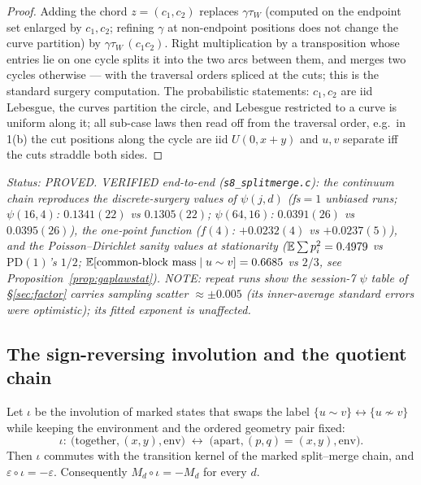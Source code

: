 \begin{proof}
Adding the chord $z=(c_1,c_2)$ replaces $\gamma\tau_W$ (computed on
the endpoint set enlarged by $c_1,c_2$; refining $\gamma$ at
non-endpoint positions does not change the curve partition) by
$\gamma\tau_W\,(c_1c_2)$.  Right multiplication by a transposition
whose entries lie on one cycle splits it into the two arcs between
them, and merges two cycles otherwise --- with the traversal orders
spliced at the cuts; this is the standard surgery computation.  The
probabilistic statements: $c_1,c_2$ are iid Lebesgue, the curves
partition the circle, and Lebesgue restricted to a curve is uniform
along it; all sub-case laws then read off from the traversal order,
e.g.\ in 1(b) the cut positions along the cycle are iid $U(0,x{+}y)$
and $u,v$ separate iff the cuts straddle both sides.
\end{proof}

\emph{Status: PROVED.  VERIFIED end-to-end
(\texttt{s8\_splitmerge.c}): the continuum chain reproduces the
discrete-surgery values of $\psi(j,d)$ (fs$=1$ unbiased runs;
$\psi(16,4)$: $0.1341(22)$ vs $0.1305(22)$;
$\psi(64,16)$: $0.0391(26)$ vs $0.0395(26)$), the one-point function
($f(4)$: $+0.0232(4)$ vs $+0.0237(5)$), and the
Poisson--Dirichlet sanity values at stationarity
($\mathbb{E}\sum p_i^2=0.4979$ vs $\mathrm{PD}(1)$'s $1/2$;
$\mathbb{E}[\text{common-block mass}\mid u\sim v]=0.6685$ vs $2/3$, see
Proposition~\ref{prop:gaplawstat}).  NOTE: repeat runs show the
session-7 $\psi$ table of \S\ref{sec:factor} carries sampling scatter
$\approx\pm0.005$ (its inner-average standard errors were optimistic);
its fitted exponent is unaffected.}

\subsection{The sign-reversing involution and the quotient chain}
\label{sec:iota}

\begin{theorem}\label{thm:iota}
Let $\iota$ be the involution of marked states that swaps the label
$\{u\sim v\}\leftrightarrow\{u\not\sim v\}$ while keeping the
environment and the ordered geometry pair fixed:
\[
\iota:\ \bigl(\text{together},(x,y),\mathrm{env}\bigr)
\;\longleftrightarrow\;
\bigl(\text{apart},(p,q)=(x,y),\mathrm{env}\bigr).
\]
Then $\iota$ commutes with the transition kernel of the marked
split--merge chain, and $\varepsilon\circ\iota=-\varepsilon$.
Consequently $M_d\circ\iota=-M_d$ for every $d$.
\end{theorem}

